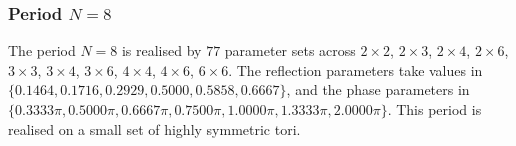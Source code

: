 \par
\subsubsection{Period $N = 8$}
The period $N=8$ is realised by $77$ parameter sets across $2\times2$, $2\times3$, $2\times4$, $2\times6$, $3\times3$, $3\times4$, $3\times6$, $4\times4$, $4\times6$, $6\times6$. The reflection parameters take values in $\{0.1464, 0.1716, 0.2929, 0.5000, 0.5858, 0.6667\}$, and the phase parameters in $\{0.3333\pi, 0.5000\pi, 0.6667\pi, 0.7500\pi, 1.0000\pi, 1.3333\pi, 2.0000\pi\}$. This period is realised on a small set of highly symmetric
tori.
